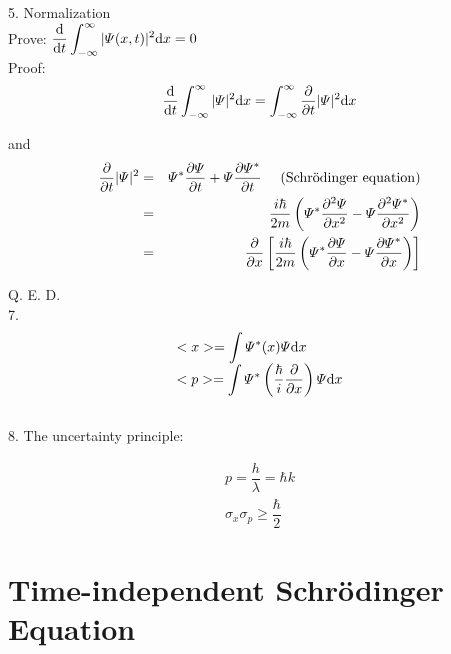 \documentclass[12pt, 
]{article}
\begin{document}
	5. Normalization
	~\\

	Prove: $\displaystyle\frac{{\rm d}}{{\rm d}t}\int^{\infty}_{-\infty}|\varPsi(x,t)|^2{\rm d}x=0$
	~\\

	Proof:
	$$\frac{{\rm d}}{{\rm d}t}\int_{-\infty}^{\infty}|\varPsi|^2{\rm d}x=\int_{-\infty}^{\infty}\frac{\partial}{\partial t}|\varPsi|^2{\rm d}x$$
	
	and 
	\begin{eqnarray*}
	\frac{\partial}{\partial t}|\varPsi|^2&=&\varPsi^*\frac{\partial \varPsi}{\partial t}+\varPsi\frac{\partial \varPsi^*}{\partial t}~~~~(\rm{Schr\ddot{o}dinger~equation})\\
	&=&\frac{i\hbar}{2m}\left(\varPsi^*\frac{\partial^2\varPsi}{\partial x^2}-\varPsi\frac{\partial^2\varPsi^*}{\partial x^2}\right)\\
	&=&\frac{\partial}{\partial x}\left[\frac{i\hbar}{2m}\left(\varPsi^*\frac{\partial \varPsi}{\partial x}-\varPsi\frac{\partial \varPsi^*}{\partial x}\right)\right]
	\end{eqnarray*}
	
	Q. E. D.
	~\\

	7.\[
		\begin{array}{l}
		<x>=\displaystyle\int\varPsi^*(x)\varPsi{\rm d}x\\
		<p>=\displaystyle\int\varPsi^*\left(\frac{\hbar}{i}\frac{\partial}{\partial x}\right)\varPsi{\rm d}x
		\end{array}
		\]
	~\\

	8. The uncertainty principle:

	\[
		\begin{array}{l}
			p=\dfrac{h}{\lambda}=\hbar k\\
			\sigma_x\sigma_p\geqslant \dfrac{\hbar}{2}
		\end{array}
		\]
	\newpage

	\section{Time-independent Schr\"odinger Equation}
\end{document}
